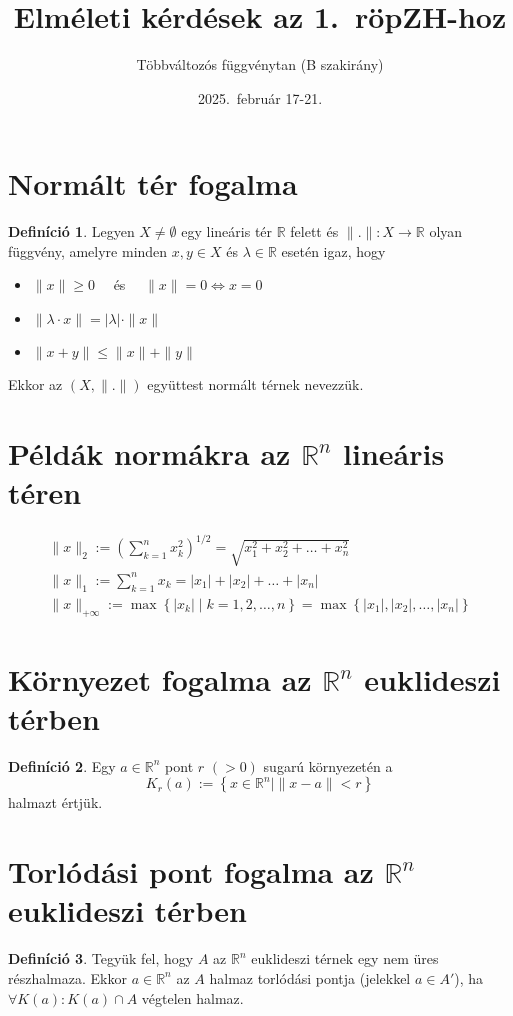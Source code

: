 \documentclass{article}
\title{Elméleti kérdések az 1.\ röpZH-hoz}
\author{Többváltozós függvénytan (B szakirány)}
\date{2025.\ február 17-21.}
\theoremstyle{definition}
\newtheorem*{definition*}{Definíció}
\begin{document}
\maketitle
\tableofcontents
\goodbreak
\section{Normált tér fogalma}
\begin{definition*}
	Legyen $X \neq \emptyset$ egy lineáris tér $\mathbb{R}$ felett és
	$\| . \|: X \to \mathbb{R}$ olyan függvény,
	amelyre minden $x, y \in X$ és $\lambda \in \mathbb{R}$ esetén igaz, hogy
	\begin{itemize}
		\item $\| x \| \geq 0 \quad$ és $\quad \| x \| = 0 \iff x = 0$
		\item $\| \lambda \cdot x \| = |\lambda| \cdot \| x \|$
		\item $\| x + y \| \leq \| x \| + \| y \|$
	\end{itemize}
	Ekkor az $(X, \| . \|)$ együttest normált térnek nevezzük.
\end{definition*}
\goodbreak
\section{Példák normákra az $\mathbb{R}^n$ lineáris téren}
\begin{gather*}
	\| x \|_2 := \left( \sum_{k = 1}^n x_k^2 \right)^{1 / 2} =
	\sqrt{x_1^2 + x_2^2 + \dots + x_n^2} \\
	\| x \|_1 := \sum_{k = 1}^n x_k = |x_1| + |x_2| + \dots + |x_n| \\
	\| x \|_{+\infty} := \max\left\{ |x_k| \mid k = 1, 2, \dots, n \right\} =
	\max\left\{ |x_1|, |x_2|, \dots, |x_n|  \right\}
\end{gather*}
\goodbreak
\section{Környezet fogalma az $\mathbb{R}^n$ euklideszi térben}
\begin{definition*}
	Egy $a \in \mathbb{R}^n$ pont $r$ $(> 0)$ sugarú környezetén a
	\begin{equation*}
		K_r(a) := \left\{ x \in \mathbb{R}^n \mid \| x - a \| < r \right\}
	\end{equation*}
	halmazt értjük.
\end{definition*}
\goodbreak
\section{Torlódási pont fogalma az $\mathbb{R}^n$ euklideszi térben}
\begin{definition*}
	Tegyük fel, hogy $A$ az $\mathbb{R}^n$ euklideszi térnek
	egy nem üres részhalmaza.
	Ekkor $a \in \mathbb{R}^n$ az $A$ halmaz torlódási pontja
	(jelekkel $a \in A'$), ha $\forall K(a): K(a) \cap A$ végtelen halmaz.
\end{definition*}
\end{document}
